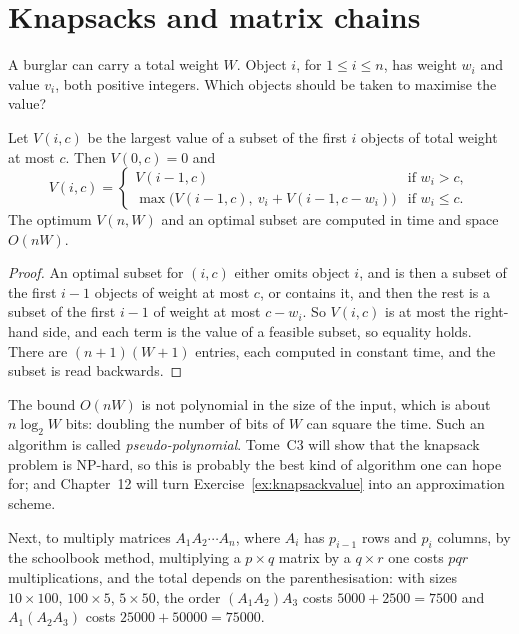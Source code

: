 \section{Knapsacks and matrix chains}\label{sec:knapsack}

A burglar can carry a total weight $W$. Object $i$, for $1\le i\le n$, has weight $w_i$ and value $v_i$, both positive integers. Which objects should be taken to maximise the value?

\begin{theorem}\label{thm:knapsack}
Let $V(i,c)$ be the largest value of a subset of the first $i$ objects of total weight at most $c$. Then $V(0,c)=0$ and
\[
V(i,c)=\begin{cases}V(i-1,c)&\text{if }w_i>c,\\ \max\big(V(i-1,c),\ v_i+V(i-1,c-w_i)\big)&\text{if }w_i\le c.\end{cases}
\]
The optimum $V(n,W)$ and an optimal subset are computed in time and space $O(nW)$.
\end{theorem}
\begin{proof}
An optimal subset for $(i,c)$ either omits object $i$, and is then a subset of the first $i-1$ objects of weight at most $c$, or contains it, and then the rest is a subset of the first $i-1$ of weight at most $c-w_i$.
So $V(i,c)$ is at most the right-hand side, and each term is the value of a feasible subset, so equality holds. There are $(n+1)(W+1)$ entries, each computed in constant time, and the subset is read backwards.
\end{proof}

The bound $O(nW)$ is not polynomial in the size of the input, which is about $n\log_2W$ bits: doubling the number of bits of $W$ can square the time. Such an algorithm is called \emph{pseudo-polynomial}.
Tome~C3 will show that the knapsack problem is NP-hard, so this is probably the best kind of algorithm one can hope for; and Chapter~12 will turn Exercise~\ref{ex:knapsackvalue} into an
approximation scheme.

Next, to multiply matrices $A_1A_2\cdots A_n$, where $A_i$ has $p_{i-1}$ rows and $p_i$ columns, by the schoolbook method, multiplying a $p\times q$ matrix by a $q\times r$ one costs $pqr$ multiplications,
and the total depends on the parenthesisation: with sizes $10\times100$, $100\times5$, $5\times50$, the order $(A_1A_2)A_3$ costs $5000+2500=7500$ and $A_1(A_2A_3)$ costs $25000+50000=75000$.

